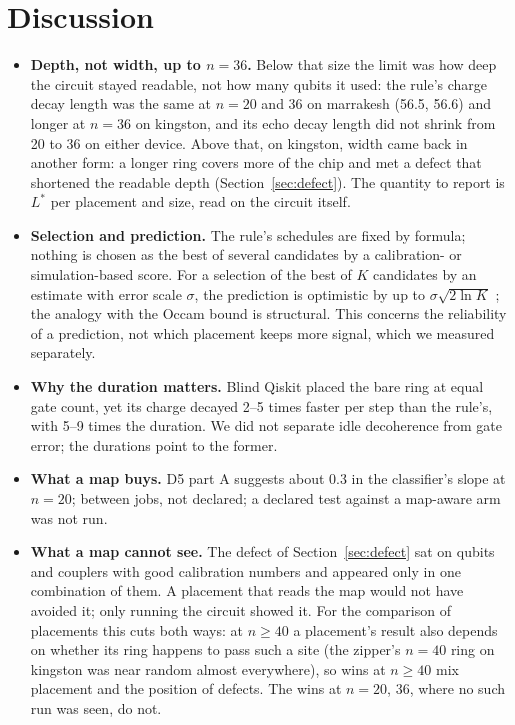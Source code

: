 \documentclass[11pt]{article}
\begin{document}
\section{Discussion}
\begin{itemize}
\item \textbf{Depth, not width, up to $n=36$.} Below that size the limit was how deep the circuit stayed readable,
  not how many qubits it used: the rule's charge decay length was the same at $n=20$ and 36 on marrakesh (56.5,
  56.6) and longer at $n=36$ on kingston, and its echo decay length did not shrink from 20 to 36 on either device.
  Above that, on kingston, width came back in another form: a longer ring covers more of the chip and met a defect
  that shortened the readable depth (Section~\ref{sec:defect}). The quantity to report is $L^*$ per placement and
  size, read on the circuit itself.
\item \textbf{Selection and prediction.} The rule's schedules are fixed by formula; nothing is chosen as the best of
  several candidates by a calibration- or simulation-based score. For a selection of the best of $K$ candidates by an
  estimate with error scale $\sigma$, the prediction is optimistic by up to $\sigma\sqrt{2\ln K}$
  \cite{smith2006}; the analogy with the Occam bound \cite{blumer1987} is structural. This concerns the reliability of
  a prediction, not which placement keeps more signal, which we measured separately.
\item \textbf{Why the duration matters.} Blind Qiskit placed the bare ring at equal gate count, yet its charge decayed
  2--5 times faster per step than the rule's, with 5--9 times the duration. We did not separate idle decoherence
  from gate error; the durations point to the former.
\item \textbf{What a map buys.} D5 part A suggests about 0.3 in the classifier's slope at $n=20$; between jobs, not
  declared; a declared test against a map-aware arm was not run.
\item \textbf{What a map cannot see.} The defect of Section~\ref{sec:defect} sat on qubits and couplers with good
  calibration numbers and appeared only in one combination of them. A placement that reads the map would not have
  avoided it; only running the circuit showed it. For the comparison of placements this cuts both ways: at $n\ge40$ a
  placement's result also depends on whether its ring happens to pass such a site (the zipper's $n=40$ ring on kingston
  was near random almost everywhere), so wins at $n\ge40$ mix placement and the position of defects. The wins at
  $n=20$, 36, where no such run was seen, do not.
\end{itemize}
\end{document}
